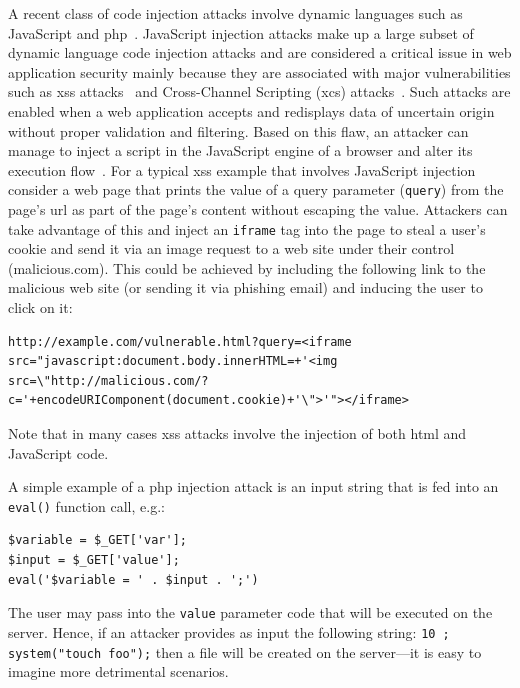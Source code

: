\documentclass[10pt,journal,compsoc]{IEEEtran}
\begin{document}
A recent class of code injection attacks involve dynamic languages
such as JavaScript and {\sc php}~\cite{SMS13}.
JavaScript injection attacks make up a large subset of dynamic
language code injection attacks and are considered a critical issue
in web application security mainly because they are associated with
major vulnerabilities such as {\sc xss} attacks~\cite{SG07} and
Cross-Channel Scripting ({\sc xcs}) attacks~\cite{BBB09}.
Such attacks are enabled when a web application accepts
and redisplays data of uncertain origin without
proper validation and filtering. Based on this flaw, an attacker
can manage to inject a script in the JavaScript engine of a browser
and alter its execution flow~\cite{ELX07}.
For a typical {\sc xss} example that involves JavaScript injection
consider a web page that prints the value
of a query parameter ({\tt query}) from the
page's {\sc url} as part of the page's content
without escaping the value. Attackers
can take advantage of this and inject an {\tt iframe} tag
into the page to steal a user's cookie and
send it via an image request to a web site
under their control (malicious.com).
This could be achieved by including the following
link to the malicious web site (or sending it via phishing
email) and inducing the user to click on it:

\lstset{language=HTML}
\begin{lstlisting}
http://example.com/vulnerable.html?query=<iframe src="javascript:document.body.innerHTML=+'<img src=\"http://malicious.com/?c='+encodeURIComponent(document.cookie)+'\">'"></iframe>
\end{lstlisting}

\noindent
Note that in many cases {\sc xss} attacks
involve the injection of both {\sc html} and JavaScript code.

A simple example of a {\sc php} injection attack is an input string
that is fed into an {\tt eval()} function call, e.g.:

\lstset{language=PHP}
\begin{lstlisting}
$variable = $_GET['var']; 
$input = $_GET['value'];
eval('$variable = ' . $input . ';')
\end{lstlisting}

\noindent
The user may pass into the {\tt value} parameter code that will
be executed on the server. Hence, if an attacker provides as
input the following string: {\tt 10 ; system("touch foo");}
then a file will be created on the server---it is easy
to imagine more detrimental scenarios.
\end{document}
